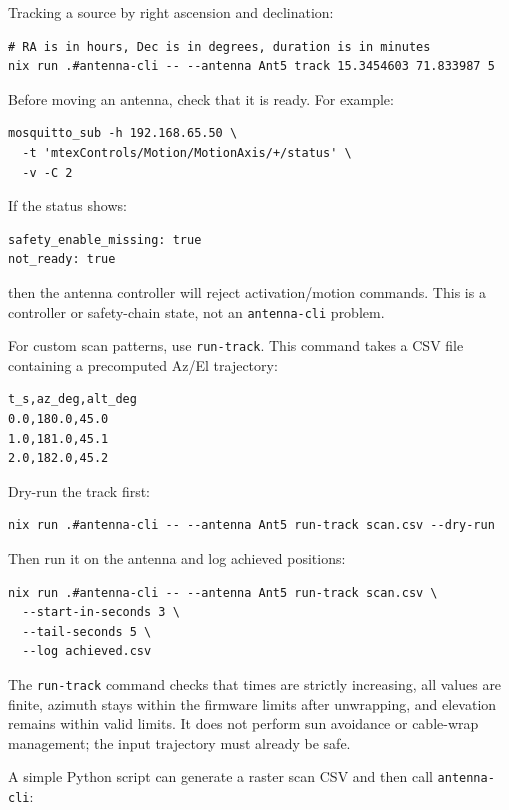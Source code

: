 \documentclass[12pt]{extarticle}
\begin{document}
Tracking a source by right ascension and declination:

\begin{lstlisting}
# RA is in hours, Dec is in degrees, duration is in minutes
nix run .#antenna-cli -- --antenna Ant5 track 15.3454603 71.833987 5
\end{lstlisting}

Before moving an antenna, check that it is ready. For example:

\begin{lstlisting}
mosquitto_sub -h 192.168.65.50 \
  -t 'mtexControls/Motion/MotionAxis/+/status' \
  -v -C 2
\end{lstlisting}

If the status shows:

\begin{lstlisting}
safety_enable_missing: true
not_ready: true
\end{lstlisting}

then the antenna controller will reject activation/motion commands. This is a
controller or safety-chain state, not an \texttt{antenna-cli} problem.

For custom scan patterns, use \texttt{run-track}. This command takes a CSV file
containing a precomputed Az/El trajectory:

\begin{lstlisting}
t_s,az_deg,alt_deg
0.0,180.0,45.0
1.0,181.0,45.1
2.0,182.0,45.2
\end{lstlisting}

Dry-run the track first:

\begin{lstlisting}
nix run .#antenna-cli -- --antenna Ant5 run-track scan.csv --dry-run
\end{lstlisting}

Then run it on the antenna and log achieved positions:

\begin{lstlisting}
nix run .#antenna-cli -- --antenna Ant5 run-track scan.csv \
  --start-in-seconds 3 \
  --tail-seconds 5 \
  --log achieved.csv
\end{lstlisting}

The \texttt{run-track} command checks that times are strictly increasing, all
values are finite, azimuth stays within the firmware limits after unwrapping,
and elevation remains within valid limits. It does not perform sun avoidance or
cable-wrap management; the input trajectory must already be safe.

A simple Python script can generate a raster scan CSV and then call
\texttt{antenna-cli}:
\end{document}
